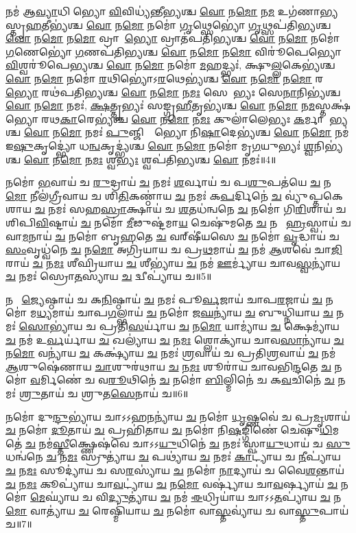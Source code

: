 𑌨𑌮॑ 𑌆\ul{𑌵𑍍𑌯𑌾}𑌧𑌿𑌨𑍀᳚𑌭𑍍𑌯𑍋 \ul{𑌵𑌿}𑌵𑌿𑌧𑍍𑌯॑𑌨𑍍𑌤𑍀𑌭𑍍𑌯𑌶𑍍𑌚 \ul{𑌵𑍋} 𑌨\ul{𑌮𑍋} 𑌨\ul{𑌮} 𑌉𑌗॑𑌣𑌾𑌭𑍍𑌯𑌸𑍍𑌤𑍃\-\ul{𑌹}𑌤𑍀𑌭𑍍𑌯॑𑌶𑍍𑌚 \ul{𑌵𑍋} 𑌨\ul{𑌮𑍋} 𑌨𑌮𑍋॑ \ul{𑌗𑍃}𑌥𑍍𑌸𑍇𑌭𑍍𑌯𑍋॑ \ul{𑌗𑍃}𑌥𑍍𑌸𑌪॑𑌤𑌿𑌭𑍍𑌯𑌶𑍍𑌚 \ul{𑌵𑍋} 𑌨\ul{𑌮𑍋} 𑌨\ul{𑌮𑍋} 𑌵𑍍𑌰𑌾𑌤𑍇᳚\ul{𑌭𑍍𑌯𑍋} 𑌵𑍍𑌰𑌾𑌤॑𑌪𑌤𑌿𑌭𑍍𑌯𑌶𑍍𑌚 \ul{𑌵𑍋} 𑌨\ul{𑌮𑍋} 𑌨𑌮𑍋॑ \ul{𑌗}𑌣𑍇𑌭𑍍𑌯𑍋॑ \ul{𑌗}𑌣𑌪॑𑌤𑌿𑌭𑍍𑌯𑌶𑍍𑌚 \ul{𑌵𑍋} 𑌨\ul{𑌮𑍋} 𑌨\ul{𑌮𑍋} 𑌵𑌿𑌰𑍂॑𑌪𑍇𑌭𑍍𑌯𑍋 \ul{𑌵𑌿}𑌶𑍍𑌵𑌰𑍂॑𑌪𑍇𑌭𑍍𑌯𑌶𑍍𑌚 \ul{𑌵𑍋} 𑌨\ul{𑌮𑍋} 𑌨𑌮𑍋॑ \ul{𑌮}𑌹𑌦𑍍𑌭𑍍𑌯𑌃॑, 𑌕𑍍𑌷𑍁\ul{𑌲𑍍𑌲}𑌕𑍇𑌭𑍍𑌯॑𑌶𑍍𑌚 \ul{𑌵𑍋} 𑌨\ul{𑌮𑍋} 𑌨𑌮𑍋॑ \ul{𑌰}𑌥𑌿𑌭𑍍𑌯𑍋॑𑌽\ul{𑌰}𑌥𑍇𑌭𑍍𑌯॑𑌶𑍍𑌚 \ul{𑌵𑍋} 𑌨\ul{𑌮𑍋} 𑌨\ul{𑌮𑍋} 𑌰𑌥𑍇᳚\ul{𑌭𑍍𑌯𑍋} 𑌰𑌥॑𑌪𑌤𑌿𑌭𑍍𑌯𑌶𑍍𑌚 \ul{𑌵𑍋} 𑌨\ul{𑌮𑍋} 𑌨\ul{𑌮𑌃} 𑌸𑍇𑌨𑌾᳚𑌭𑍍𑌯𑌃 𑌸𑍇\ul{𑌨𑌾}𑌨𑌿𑌭𑍍𑌯॑𑌶𑍍𑌚 \ul{𑌵𑍋} 𑌨\ul{𑌮𑍋} 𑌨𑌮𑌃॑, \ul{𑌕𑍍𑌷}𑌤𑍍𑌤𑍃𑌭𑍍𑌯𑌃॑ 𑌸𑌙𑍍𑌗𑍍𑌰\ul{𑌹𑍀}𑌤𑍃𑌭𑍍𑌯॑𑌶𑍍𑌚 \ul{𑌵𑍋} 𑌨\ul{𑌮𑍋} 𑌨\ul{𑌮}𑌸𑍍𑌤𑌕𑍍𑌷॑𑌭𑍍𑌯𑍋 𑌰𑌥\ul{𑌕𑌾}𑌰𑍇𑌭𑍍𑌯॑𑌶𑍍𑌚 \ul{𑌵𑍋} 𑌨\ul{𑌮𑍋} 𑌨\ul{𑌮𑌃} 𑌕𑍁𑌲𑌾॑𑌲𑍇𑌭𑍍𑌯𑌃 \ul{𑌕}𑌰𑍍𑌮𑌾𑌰𑍇᳚𑌭𑍍𑌯𑌶𑍍𑌚 \ul{𑌵𑍋} 𑌨\ul{𑌮𑍋} 𑌨𑌮𑌃॑ \ul{𑌪𑍁}𑌞𑍍𑌜𑌿𑌷𑍍𑌟𑍇᳚𑌭𑍍𑌯𑍋 𑌨𑌿\ul{𑌷𑌾}𑌦𑍇𑌭𑍍𑌯॑𑌶𑍍𑌚 \ul{𑌵𑍋} 𑌨\ul{𑌮𑍋} 𑌨𑌮॑ 𑌇\ul{𑌷𑍁}𑌕𑍃𑌦𑍍𑌭𑍍𑌯𑍋॑ 𑌧\ul{𑌨𑍍𑌵}𑌕𑍃𑌦𑍍𑌭𑍍𑌯॑𑌶𑍍𑌚 \ul{𑌵𑍋} 𑌨\ul{𑌮𑍋} 𑌨𑌮𑍋॑ 𑌮𑍃\ul{𑌗}𑌯𑍁𑌭𑍍𑌯𑌃॑ \ul{𑌶𑍍𑌵}𑌨𑌿𑌭𑍍𑌯॑𑌶𑍍𑌚 \ul{𑌵𑍋} 𑌨\ul{𑌮𑍋} 𑌨\ul{𑌮𑌃} 𑌶𑍍𑌵\ul{𑌭𑍍𑌯𑌃} 𑌶𑍍𑌵𑌪॑𑌤𑌿𑌭𑍍𑌯𑌶𑍍𑌚 \ul{𑌵𑍋} 𑌨𑌮𑌃॑॥4॥ 

𑌨𑌮𑍋॑ \ul{𑌭}𑌵𑌾𑌯॑ 𑌚 \ul{𑌰𑍁}𑌦𑍍𑌰𑌾𑌯॑ \ul{𑌚} 𑌨𑌮𑌃॑ \ul{𑌶}𑌰𑍍𑌵𑌾𑌯॑ 𑌚 𑌪\ul{𑌶𑍁}𑌪𑌤॑𑌯𑍇 \ul{𑌚} 𑌨\ul{𑌮𑍋} 𑌨𑍀𑌲॑𑌗𑍍𑌰𑍀𑌵𑌾𑌯 𑌚 𑌶𑌿\ul{𑌤𑌿}𑌕𑌣𑍍𑌠𑌾॑𑌯 \ul{𑌚} 𑌨𑌮𑌃॑ 𑌕\ul{𑌪}𑌰𑍍𑌦𑌿𑌨𑍇॑ \ul{𑌚} 𑌵𑍍𑌯𑍁॑𑌪𑍍𑌤𑌕𑍇𑌶𑌾𑌯 \ul{𑌚} 𑌨𑌮𑌃॑ 𑌸𑌹\ul{𑌸𑍍𑌰𑌾}𑌕𑍍𑌷𑌾𑌯॑ 𑌚 \ul{𑌶}𑌤𑌧॑𑌨𑍍𑌵𑌨𑍇 \ul{𑌚} 𑌨𑌮𑍋॑ 𑌗𑌿\ul{𑌰𑌿}𑌶𑌾𑌯॑ 𑌚 𑌶𑌿𑌪𑌿\ul{𑌵𑌿}𑌷𑍍𑌟𑌾𑌯॑ \ul{𑌚} 𑌨𑌮𑍋॑ \ul{𑌮𑍀}𑌢𑍁𑌷𑍍𑌟॑𑌮𑌾\ul{𑌯} 𑌚𑍇𑌷𑍁॑𑌮𑌤𑍇 \ul{𑌚} 𑌨𑌮𑍋᳚ \ul{𑌹𑍍𑌰}𑌸𑍍𑌵𑌾𑌯॑ 𑌚 𑌵𑌾\ul{𑌮}𑌨𑌾𑌯॑ \ul{𑌚} 𑌨𑌮𑍋॑ 𑌬𑍃\ul{𑌹}𑌤𑍇 \ul{𑌚} 𑌵𑌰𑍍‌𑌷𑍀॑𑌯𑌸𑍇 \ul{𑌚} 𑌨𑌮𑍋॑ \ul{𑌵𑍃}𑌦𑍍𑌧𑌾𑌯॑ 𑌚 \ul{𑌸𑌂}𑌵𑍃𑌧𑍍𑌵॑𑌨𑍇 \ul{𑌚} 𑌨\ul{𑌮𑍋} 𑌅𑌗𑍍𑌰𑌿॑𑌯𑌾𑌯 𑌚 𑌪𑍍𑌰\ul{𑌥}𑌮𑌾𑌯॑ \ul{𑌚} 𑌨𑌮॑ \ul{𑌆}𑌶𑌵𑍇॑ 𑌚𑌾\ul{𑌜𑌿}𑌰𑌾𑌯॑ \ul{𑌚} 𑌨\ul{𑌮𑌃} 𑌶𑍀𑌘𑍍𑌰𑌿॑𑌯𑌾𑌯 \ul{𑌚} 𑌶𑍀𑌭𑍍𑌯𑌾॑𑌯 \ul{𑌚} 𑌨𑌮॑ \ul{𑌊}𑌰𑍍𑌮𑍍𑌯𑌾॑𑌯 𑌚𑌾𑌵\ul{𑌸𑍍𑌵}𑌨𑍍𑌯𑌾॑𑌯 \ul{𑌚} 𑌨𑌮𑌃॑ 𑌸𑍍𑌰𑍋\ul{𑌤}𑌸𑍍𑌯𑌾॑𑌯 \ul{𑌚} 𑌦𑍍𑌵𑍀𑌪𑍍𑌯𑌾॑𑌯 𑌚॥5॥ 

𑌨𑌮𑍋᳚ \ul{𑌜𑍍𑌯𑍇}𑌷𑍍𑌠𑌾𑌯॑ 𑌚 𑌕\ul{𑌨𑌿}𑌷𑍍𑌠𑌾𑌯॑ \ul{𑌚} 𑌨𑌮𑌃॑ 𑌪𑍂\ul{𑌰𑍍𑌵}𑌜𑌾𑌯॑ 𑌚𑌾𑌪\ul{𑌰}𑌜𑌾𑌯॑ \ul{𑌚} 𑌨𑌮𑍋॑ 𑌮\ul{𑌧𑍍𑌯}𑌮𑌾𑌯॑ 𑌚𑌾𑌪\ul{𑌗}𑌲𑍍𑌭𑌾𑌯॑ \ul{𑌚} 𑌨𑌮𑍋॑ 𑌜\ul{𑌘}𑌨𑍍𑌯𑌾॑𑌯 \ul{𑌚} 𑌬𑍁𑌧𑍍𑌨𑌿॑𑌯𑌾𑌯 \ul{𑌚} 𑌨𑌮𑌃॑ \ul{𑌸𑍋}𑌭𑍍𑌯𑌾॑𑌯 𑌚 𑌪𑍍𑌰𑌤𑌿\ul{𑌸}𑌰𑍍𑌯𑌾॑𑌯 \ul{𑌚} 𑌨\ul{𑌮𑍋} 𑌯𑌾𑌮𑍍𑌯𑌾॑𑌯 \ul{𑌚} 𑌕𑍍𑌷𑍇𑌮𑍍𑌯𑌾॑𑌯 \ul{𑌚} 𑌨𑌮॑ 𑌉\ul{𑌰𑍍𑌵}𑌰𑍍𑌯𑌾॑𑌯 \ul{𑌚} 𑌖𑌲𑍍𑌯𑌾॑𑌯 \ul{𑌚} 𑌨\ul{𑌮𑌃} 𑌶𑍍𑌲𑍋𑌕𑍍𑌯𑌾॑𑌯 𑌚𑌾𑌵\ul{𑌸𑌾}𑌨𑍍𑌯𑌾॑𑌯 \ul{𑌚} 𑌨\ul{𑌮𑍋} 𑌵𑌨𑍍𑌯𑌾॑𑌯 \ul{𑌚} 𑌕𑌕𑍍𑌷𑍍𑌯𑌾॑𑌯 \ul{𑌚} 𑌨𑌮𑌃॑ \ul{𑌶𑍍𑌰}𑌵𑌾𑌯॑ 𑌚 𑌪𑍍𑌰𑌤𑌿\ul{𑌶𑍍𑌰}𑌵𑌾𑌯॑ \ul{𑌚} 𑌨𑌮॑ \ul{𑌆}𑌶𑍁𑌷𑍇॑𑌣𑌾𑌯 \ul{𑌚𑌾}𑌶𑍁𑌰॑𑌥𑌾𑌯 \ul{𑌚} 𑌨\ul{𑌮𑌃} 𑌶𑍂𑌰𑌾॑𑌯 𑌚𑌾𑌵𑌭𑌿\ul{𑌨𑍍𑌦}𑌤𑍇 \ul{𑌚} 𑌨𑌮𑍋॑ \ul{𑌵}𑌰𑍍𑌮𑌿𑌣𑍇॑ 𑌚 𑌵\ul{𑌰𑍂}𑌥𑌿𑌨𑍇॑ \ul{𑌚} 𑌨𑌮𑍋॑ \ul{𑌬𑌿}𑌲𑍍𑌮𑌿𑌨𑍇॑ 𑌚 𑌕\ul{𑌵}𑌚𑌿𑌨𑍇॑ \ul{𑌚} 𑌨𑌮𑌃॑ \ul{𑌶𑍍𑌰𑍁}𑌤𑌾𑌯॑ 𑌚 𑌶𑍍𑌰𑍁𑌤\ul{𑌸𑍇}𑌨𑌾𑌯॑ 𑌚॥6॥ 

𑌨𑌮𑍋॑ 𑌦𑍁\ul{𑌨𑍍𑌦𑍁}𑌭𑍍𑌯𑌾॑𑌯 𑌚𑌾𑌽𑌽𑌹\ul{𑌨}𑌨𑍍𑌯𑌾॑𑌯 \ul{𑌚} 𑌨𑌮𑍋॑ \ul{𑌧𑍃}𑌷𑍍𑌣𑌵𑍇॑ 𑌚 𑌪𑍍𑌰\ul{𑌮𑍃}𑌶𑌾𑌯॑ \ul{𑌚} 𑌨𑌮𑍋॑ \ul{𑌦𑍂}𑌤𑌾𑌯॑ \ul{𑌚} 𑌪𑍍𑌰𑌹𑌿॑𑌤𑌾𑌯 \ul{𑌚} 𑌨𑌮𑍋॑ 𑌨𑌿\ul{𑌷}𑌙𑍍𑌗𑌿𑌣𑍇॑ 𑌚𑍇𑌷𑍁\ul{𑌧𑌿}𑌮𑌤𑍇॑ \ul{𑌚} 𑌨𑌮॑\ul{𑌸𑍍𑌤𑍀}𑌕𑍍𑌷𑍍𑌣𑍇𑌷॑𑌵𑍇 𑌚𑌾𑌽𑌽\ul{𑌯𑍁}𑌧𑌿𑌨𑍇॑ \ul{𑌚} 𑌨𑌮𑌃॑ 𑌸𑍍𑌵𑌾\ul{𑌯𑍁}𑌧𑌾𑌯॑ 𑌚 \ul{𑌸𑍁}𑌧𑌨𑍍𑌵॑𑌨𑍇 \ul{𑌚} 𑌨\ul{𑌮𑌃} 𑌸𑍍𑌰𑍁𑌤𑍍𑌯𑌾॑𑌯 \ul{𑌚} 𑌪𑌥𑍍𑌯𑌾॑𑌯 \ul{𑌚} 𑌨𑌮𑌃॑ \ul{𑌕𑌾}𑌟𑍍𑌯𑌾॑𑌯 𑌚 \ul{𑌨𑍀}𑌪𑍍𑌯𑌾॑𑌯 \ul{𑌚} 𑌨\ul{𑌮𑌃} 𑌸𑍂𑌦𑍍𑌯𑌾॑𑌯 𑌚 𑌸\ul{𑌰}𑌸𑍍𑌯𑌾॑𑌯 \ul{𑌚} 𑌨𑌮𑍋॑ \ul{𑌨𑌾}𑌦𑍍𑌯𑌾𑌯॑ 𑌚 𑌵𑍈\ul{𑌶}𑌨𑍍𑌤𑌾𑌯॑ \ul{𑌚} 𑌨\ul{𑌮𑌃} 𑌕𑍂𑌪𑍍𑌯𑌾॑𑌯 𑌚𑌾\ul{𑌵}𑌟𑍍𑌯𑌾॑𑌯 \ul{𑌚} 𑌨\ul{𑌮𑍋} 𑌵𑌰𑍍𑌷𑍍𑌯𑌾॑𑌯 𑌚𑌾\ul{𑌵}𑌰𑍍𑌷𑍍𑌯𑌾𑌯॑ \ul{𑌚} 𑌨𑌮𑍋॑ \ul{𑌮𑍇}𑌘𑍍𑌯𑌾॑𑌯 𑌚 𑌵𑌿\ul{𑌦𑍍𑌯𑍁}𑌤𑍍𑌯𑌾॑𑌯 \ul{𑌚} 𑌨𑌮॑ \ul{𑌈}𑌧𑍍𑌰𑌿𑌯𑌾॑𑌯 𑌚𑌾𑌽𑌽\ul{𑌤}𑌪𑍍𑌯𑌾॑𑌯 \ul{𑌚} 𑌨\ul{𑌮𑍋} 𑌵𑌾𑌤𑍍𑌯𑌾॑𑌯 \ul{𑌚} 𑌰𑍇𑌷𑍍𑌮𑌿॑𑌯𑌾𑌯 \ul{𑌚} 𑌨𑌮𑍋॑ 𑌵𑌾\ul{𑌸𑍍𑌤}𑌵𑍍𑌯𑌾॑𑌯 𑌚 𑌵𑌾\ul{𑌸𑍍𑌤𑍁}𑌪𑌾𑌯॑ 𑌚॥7॥ 

